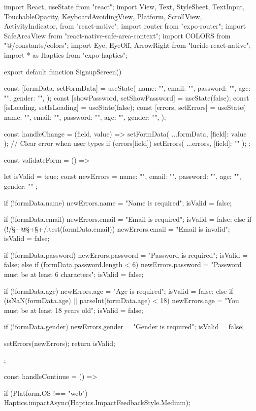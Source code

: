 import React, { useState } from "react";
import {
  View,
  Text,
  StyleSheet,
  TextInput,
  TouchableOpacity,
  KeyboardAvoidingView,
  Platform,
  ScrollView,
  ActivityIndicator,
} from "react-native";
import { router } from "expo-router";
import { SafeAreaView } from "react-native-safe-area-context";
import { COLORS } from "@/constants/colors";
import { Eye, EyeOff, ArrowRight } from "lucide-react-native";
import * as Haptics from "expo-haptics";

export default function SignupScreen() {
  const [formData, setFormData] = useState({
    name: "",
    email: "",
    password: "",
    age: "",
    gender: "",
  });
  const [showPassword, setShowPassword] = useState(false);
  const [isLoading, setIsLoading] = useState(false);
  const [errors, setErrors] = useState({
    name: "",
    email: "",
    password: "",
    age: "",
    gender: "",
  });

  const handleChange = (field, value) => {
    setFormData({ ...formData, [field]: value });
    // Clear error when user types
    if (errors[field]) {
      setErrors({ ...errors, [field]: "" });
    }
  };

  const validateForm = () => {
    let isValid = true;
    const newErrors = { name: "", email: "", password: "", age: "", gender: "" };

    if (!formData.name) {
      newErrors.name = "Name is required";
      isValid = false;
    }

    if (!formData.email) {
      newErrors.email = "Email is required";
      isValid = false;
    } else if (!/\S+@\S+\.\S+/.test(formData.email)) {
      newErrors.email = "Email is invalid";
      isValid = false;
    }

    if (!formData.password) {
      newErrors.password = "Password is required";
      isValid = false;
    } else if (formData.password.length < 6) {
      newErrors.password = "Password must be at least 6 characters";
      isValid = false;
    }

    if (!formData.age) {
      newErrors.age = "Age is required";
      isValid = false;
    } else if (isNaN(formData.age) || parseInt(formData.age) < 18) {
      newErrors.age = "You must be at least 18 years old";
      isValid = false;
    }

    if (!formData.gender) {
      newErrors.gender = "Gender is required";
      isValid = false;
    }

    setErrors(newErrors);
    return isValid;
  };

  const handleContinue = () => {
    if (Platform.OS !== "web") {
      Haptics.impactAsync(Haptics.ImpactFeedbackStyle.Medium);
    }
    
}}
